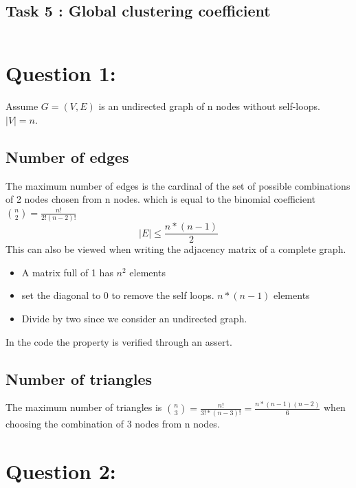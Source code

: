 \documentclass[a4paper]{article}
\begin{document}
\subsection*{Task 5 : Global clustering coefficient}
\begin{verbatim}
\end{verbatim}


\section{Question 1:}
Assume $G = (V, E)$ is an undirected graph of n nodes without self-loops. $|V|=n$.
\subsection*{Number of edges}
The maximum number of edges is the cardinal of the set of possible combinations of 2 nodes chosen from n nodes.
which is equal to the binomial coefficient $\binom{n}{2} = \frac{n!}{2! (n-2)!}$
\begin{equation}\label{eq 1.1}
|E| \leq \frac{n*(n-1)}{2}
\end{equation}
This can also be viewed when writing the adjacency matrix of a complete graph.
\begin{itemize}
    \item  A matrix full of 1 has $n^2$ elements
    \item set the diagonal to 0 to remove the self loops. $n*(n-1)$ elements
    \item Divide by two since we consider an undirected graph.
\end{itemize}


In the code the property is verified through an assert.

\subsection*{Number of triangles}
The maximum number of triangles is $\binom{n}{3} = \frac{n!}{3! * (n-3)!} = \frac{n*(n-1)(n-2)}{6}$ 
when choosing the combination of 3 nodes from n nodes.


\section{Question 2:}



\end{document}
